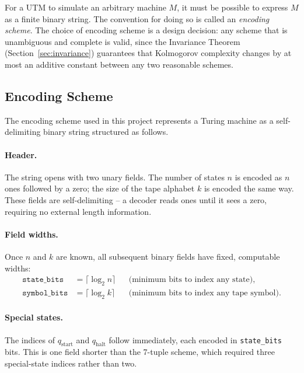 \documentclass[11pt]{article}
\begin{document}
For a UTM to simulate an arbitrary machine $M$, it must be possible to express $M$ as a
finite binary string. The convention for doing so is called an \emph{encoding scheme}. The
choice of encoding scheme is a design decision: any scheme that is unambiguous and
complete is valid, since the Invariance Theorem (Section~\ref{sec:invariance}) guarantees
that Kolmogorov complexity changes by at most an additive constant between any two
reasonable schemes.

\subsection{Encoding Scheme}
\label{sec:encoding}

The encoding scheme used in this project represents a Turing machine as a self-delimiting
binary string structured as follows.

\paragraph{Header.} The string opens with two unary fields. The number of states $n$ is
encoded as $n$ ones followed by a zero; the size of the tape alphabet $k$ is encoded the
same way. These fields are self-delimiting -- a decoder reads ones until it sees a zero,
requiring no external length information.

\paragraph{Field widths.} Once $n$ and $k$ are known, all subsequent binary fields have
fixed, computable widths:
\begin{align*}
  \texttt{state\_bits}  &= \lceil \log_2 n \rceil && \text{(minimum bits to index any state)},\\
  \texttt{symbol\_bits} &= \lceil \log_2 k \rceil && \text{(minimum bits to index any tape symbol)}.
\end{align*}

\paragraph{Special states.} The indices of $q_{\text{start}}$ and $q_{\text{halt}}$ follow
immediately, each encoded in \texttt{state\_bits} bits. This is one field shorter than the
7-tuple scheme, which required three special-state indices rather than two.
\end{document}
